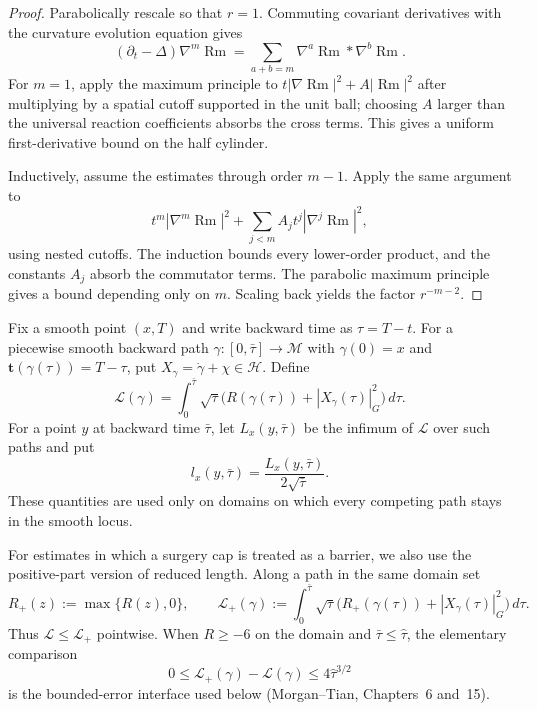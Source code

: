 \begin{proof}
Parabolically rescale so that $r=1$.  Commuting covariant derivatives with
the curvature evolution equation gives
\[
 (\partial_t-\Delta)\nabla^m\operatorname{Rm}
 =\sum_{a+b=m}\nabla^a\operatorname{Rm}*\nabla^b\operatorname{Rm}.
\]
For $m=1$, apply the maximum principle to
$t|\nabla\operatorname{Rm}|^2+A|\operatorname{Rm}|^2$ after multiplying by
a spatial cutoff supported in the unit ball; choosing $A$ larger than the
universal reaction coefficients absorbs the cross terms.  This gives a
uniform first-derivative bound on the half cylinder.

Inductively, assume the estimates through order $m-1$.  Apply the same
argument to
\[
 t^m|\nabla^m\operatorname{Rm}|^2
 +\sum_{j<m}A_jt^j|\nabla^j\operatorname{Rm}|^2,
\]
using nested cutoffs.  The induction bounds every lower-order product, and
the constants $A_j$ absorb the commutator terms.  The parabolic maximum
principle gives a bound depending only on $m$.  Scaling back yields the
factor $r^{-m-2}$.
\end{proof}

\begin{definition}
\label{def:reduced-length}
\notready
Fix a smooth point $(x,T)$ and write backward time as $\tau=T-t$.  For a
piecewise smooth backward path $\gamma\colon[0,\bar\tau]\to\mathcal M$
with $\gamma(0)=x$ and $\mathbf t(\gamma(\tau))=T-\tau$, put
$X_\gamma=\dot\gamma+\chi\in\mathcal H$.  Define
\[
 \mathcal L(\gamma)=
 \int_0^{\bar\tau}\sqrt\tau
 \bigl(R(\gamma(\tau))+|X_\gamma(\tau)|_G^2\bigr)\,d\tau.
\]
For a point $y$ at backward time $\bar\tau$, let
$L_x(y,\bar\tau)$ be the infimum of $\mathcal L$ over such paths and put
\[
 l_x(y,\bar\tau)=\frac{L_x(y,\bar\tau)}{2\sqrt{\bar\tau}}.
\]
These quantities are used only on domains on which every competing path
stays in the smooth locus.
\end{definition}

For estimates in which a surgery cap is treated as a barrier, we also use the
positive-part version of reduced length.  Along a path in the same domain set
\[
 R_+(z):=\max\{R(z),0\},\qquad
 \mathcal L_+(\gamma):=
 \int_0^{\bar\tau}\sqrt\tau\bigl(R_+(\gamma(\tau))+
 |X_\gamma(\tau)|_G^2\bigr)\,d\tau.
\]
Thus $\mathcal L\le\mathcal L_+$ pointwise.  When
$R\ge-6$ on the domain and $\bar\tau\le\widehat\tau$, the elementary
comparison
\[
 0\le \mathcal L_+(\gamma)-\mathcal L(\gamma)
 \le 4\widehat\tau^{3/2}
\]
is the bounded-error interface used below (Morgan--Tian, Chapters~6 and~15).

